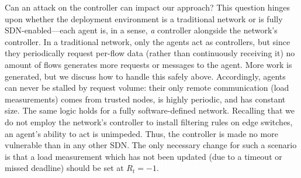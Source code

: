 \documentclass[10pt, times, comsoc]{IEEEtran}
\begin{document}
\cbstart
{\color{revisiontext}Can an attack on the controller can impact our approach?
This question hinges upon whether the deployment environment is a traditional network or is fully SDN-enabled---each agent is, in a sense, \emph{a} controller alongside the network's controller.
In a traditional network, only the agents act as controllers, but since they periodically request per-flow data (rather than continuously receiving it) no amount of flows generates more requests or messages to the agent.
More work is generated, but we discuss how to handle this safely above.
Accordingly, agents can never be stalled by request volume: their only remote communication (load measurements) comes from trusted nodes, is highly periodic, and has constant size.
The same logic holds for a fully software-defined network.
Recalling that we do not employ the network's controller to install filtering rules on edge switches, an agent's ability to act is unimpeded.
Thus, the controller is made no more vulnerable than in any other SDN.
The only necessary change for such a scenario is that a load measurement which has not been updated (due to a timeout or missed deadline) should be set at $R_t=-1$.}
\cbend
%	
%
%	
\end{document}
